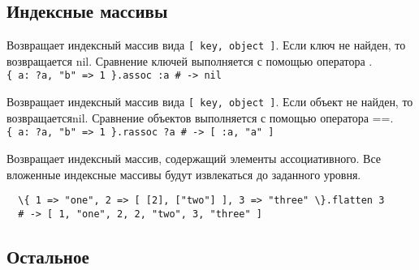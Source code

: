 \subsection*{Индексные массивы}

\begin{methodlist}
  Возвращает индексный массив вида \verb![ key, object ]!. Если ключ не найден, то возвращается nil. Сравнение ключей выполняется с помощью оператора \method{==}. 
  \\\verb!{ a: ?a, "b" => 1 }.assoc :a # -> nil!
 
  Возвращает индексный массив вида \verb![ key, object ]!. Если объект не найден, то возвращаетсяnil. Сравнение объектов выполняется с помощью оператора ==. 
  \\\verb!{ a: ?a, "b" => 1 }.rassoc ?a # -> [ :a, "a" ]!

  Возвращает индексный массив, содержащий элементы ассоциативного. Все вложенные индексные массивы будут извлекаться до заданного уровня.
  \begin{verbatim}
  \{ 1 => "one", 2 => [ [2], ["two"] ], 3 => "three" \}.flatten 3 
  # -> [ 1, "one", 2, 2, "two", 3, "three" ]
  \end{verbatim}
\end{methodlist}

\subsection*{Остальное}

